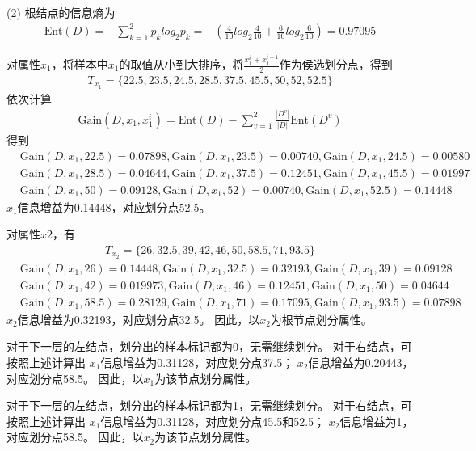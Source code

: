 \documentclass[a4paper,utf8]{article}
\begin{document}
	\noindent (2) 根结点的信息熵为
	\begin{align*}
		\text{Ent}(D)=-\sum\limits_{k=1}^2 p_k log_2 p_k
		=-(\frac{4}{10}log_2\frac{4}{10}+\frac{6}{10}log_2\frac{6}{10})
		=0.97095
	\end{align*}

	对属性$x_1$，将样本中$x_1$的取值从小到大排序，将$\frac{x_1^i+x_1^{i+1}}{2}$作为侯选划分点，得到
	\begin{align*}
		T_{x_1}=\{22.5,23.5,24.5,28.5,37.5,45.5,50,52,52.5\}
	\end{align*}
	依次计算
	\begin{align*}
		\text{Gain}(D,x_1,x_1^i)
		=\text{Ent}(D)-\sum\limits_{v=1}^2\frac{|D^v|}{|D|}\text{Ent}(D^v)
	\end{align*}
	得到
	\begin{align*}
		& \text{Gain}(D,x_1,22.5)=0.07898,\text{Gain}(D,x_1,23.5)=0.00740,\text{Gain}(D,x_1,24.5)=0.00580 \\
		& \text{Gain}(D,x_1,28.5)=0.04644,\text{Gain}(D,x_1,37.5)=0.12451,\text{Gain}(D,x_1,45.5)=0.01997 \\
		& \text{Gain}(D,x_1,50)=0.09128,\text{Gain}(D,x_1,52)=0.00740,\text{Gain}(D,x_1,52.5)=0.14448
	\end{align*}
	$x_1$信息增益为0.14448，对应划分点52.5。

	对属性$x2$，有
	\begin{align*}
		T_{x_2}=\{26,32.5,39,42,46,50,58.5,71,93.5\}
	\end{align*}
	\begin{align*}
		& \text{Gain}(D,x_1,26)=0.14448,\text{Gain}(D,x_1,32.5)=0.32193,\text{Gain}(D,x_1,39)=0.09128 \\
		& \text{Gain}(D,x_1,42)=0.019973,\text{Gain}(D,x_1,46)=0.12451,\text{Gain}(D,x_1,50)=0.04644 \\
		& \text{Gain}(D,x_1,58.5)=0.28129,\text{Gain}(D,x_1,71)=0.17095,\text{Gain}(D,x_1,93.5)=0.07898
	\end{align*}
	$x_2$信息增益为0.32193，对应划分点32.5。
	因此，以$x_2$为根节点划分属性。

	对于下一层的左结点，划分出的样本标记都为0，无需继续划分。
	对于右结点，可按照上述计算出
	$x_1$信息增益为0.31128，对应划分点37.5；
	$x_2$信息增益为0.20443，对应划分点58.5。
	因此，以$x_1$为该节点划分属性。

	对于下一层的左结点，划分出的样本标记都为1，无需继续划分。
	对于右结点，可按照上述计算出
	$x_1$信息增益为0.31128，对应划分点45.5和52.5；
	$x_2$信息增益为1，对应划分点58.5。
	因此，以$x_2$为该节点划分属性。
\end{document}
